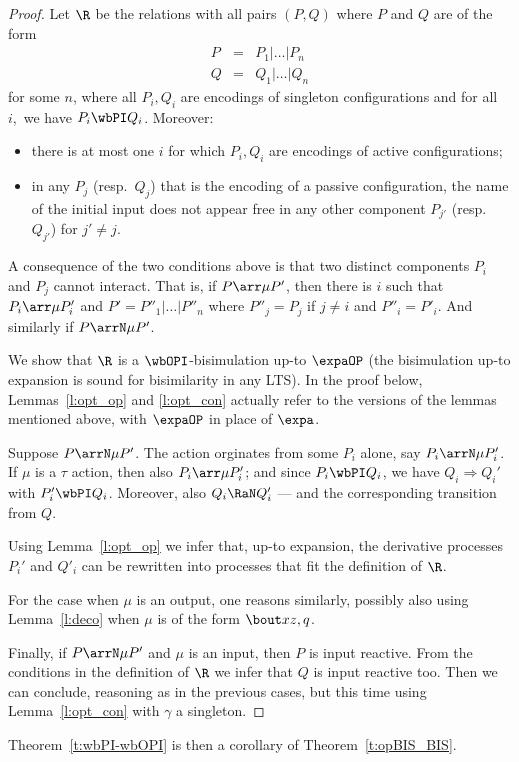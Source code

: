 \begin{proof}
Let $\R$ be the relations with all pairs $(P,Q)$ where $P$ and $Q$ are of the
form 
\[
\begin{array}{rcl}
 P &=&   %
P_1  | \ldots | P_n
\\
 Q &=& %
Q_1  | \ldots | Q_n
\end{array}
 \] 
for some $n$, where all $P_i,Q_i$ are 
encodings of singleton configurations and  for all $i, $ we have $P_i \wbPI Q_i$.
Moreover:
\begin{itemize}
\item
 there is at most one $i$ for which  $P_i,Q_i$ are encodings of  active
configurations;
\item  in any $P_j$ (resp.\ $Q_j$) that is the encoding of a passive
configuration, the name of the initial input does not appear free in any other component
$P_{j'}$ (resp.\ $Q_{j'}$) for $j'\neq j$. 
\end{itemize} 
\noindent
A consequence of the two conditions above is that two distinct components $P_i$ and $P_j$
cannot interact. That is, if $P \arr \mu P'$,  then there is $i$ such
that $P_i \arr \mu P'_i$ and $P' = P''_1| \ldots | P''_n$ where $P''_j = P_j $ if $j\neq i$
and $P''_i = P'_i $. And similarly if   $P \arrN \mu P'$.



We  show that  $\R$ is a  $\wbOPI$-bisimulation  up-to $\expaOP$ (the bisimulation
up-to expansion is sound for bisimilarity in any LTS). 
In the proof below,  Lemmas~\ref{l:opt_op}  and 
\ref{l:opt_con}
actually refer to the versions of the lemmas mentioned above, with $\expaOP$
in place of $\expa$.  


Suppose $P \arrN \mu P'$.  The action orginates from some $P_i$ alone, say $P_i \arrN\mu P_i'$.
If $\mu$ is a $\tau $ action, then also $P_i \arr\mu P_i'$; 
and since $P_i \wbPI Q_i$, we have $Q_i \Longrightarrow  Q_i'$ with $P_i' \wbPI Q_i$.  
Moreover, also $Q_i \RaN  Q_i'$ --- and the corresponding transition from $Q$.


Using Lemma~\ref{l:opt_op} we infer that, up-to expansion, the
derivative processes $P_i'$ and $Q'_i$ can be rewritten into processes
that fit the definition of $\R$. 

For the case when $\mu$ is an output, one reasons similarly, possibly
also using Lemma~\ref{l:deco} when $\mu $ is of the form $\bout x {z,q}$.  

Finally, if $P \arrN \mu P'$ and $\mu$ is an input, then $P $ is input
reactive. From the conditions in the definition of $\R$ we infer that
$Q$ is input reactive too.  Then we can conclude, reasoning as in the
previous cases, but this time  using Lemma~\ref{l:opt_con} with
$\gamma   $ a singleton.  
\end{proof}  
\noindent
Theorem~\ref{t:wbPI-wbOPI}  is then a corollary of
Theorem~\ref{t:opBIS_BIS}.  



